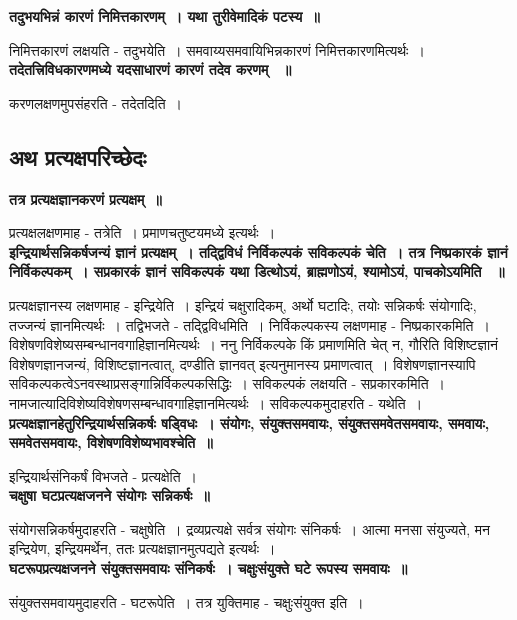 {\bfseries तदुभयभिन्नं कारणं निमित्तकारणम्~। यथा तुरीवेमादिकं पटस्य~॥}\par
	निमित्तकारणं लक्षयति - तदुभयेति~। समवाय्यसमवायिभिन्नकारणं निमित्तकारणमित्यर्थः~।\\[10pt]
{\bfseries तदेतत्त्रिविधकारणमध्ये यदसाधारणं कारणं तदेव करणम् ~॥}\par
	करणलक्षणमुपसंहरति - तदेतदिति~। \subsection*{अथ प्रत्यक्षपरिच्छेदः}
{\bfseries तत्र प्रत्यक्षज्ञानकरणं प्रत्यक्षम्~॥}\par
	प्रत्यक्षलक्षणमाह - तत्रेति~। प्रमाणचतुष्टयमध्ये इत्यर्थः~।\\[10pt]
{\bfseries इन्द्रियार्थसन्निकर्षजन्यं ज्ञानं प्रत्यक्षम्~। तद्द्विविधं निर्विकल्पकं सविकल्पकं चेति~। तत्र निष्प्रकारकं ज्ञानं निर्विकल्पकम्~। सप्रकारकं ज्ञानं सविकल्पकं यथा डित्थोऽयं, ब्राह्मणोऽयं, श्यामोऽयं, पाचकोऽयमिति ~॥}\par
	प्रत्यक्षज्ञानस्य लक्षणमाह - इन्द्रियेति~। इन्द्रियं चक्षुरादिकम्, अर्थो घटादिः, तयोः सन्निकर्षः संयोगादिः, तज्जन्यं ज्ञानमित्यर्थः~। तद्विभजते - तद्द्विविधमिति~। निर्विकल्पकस्य लक्षणमाह - निष्प्रकारकमिति~। विशेषणविशेष्यसम्बन्धानवगाहिज्ञानमित्यर्थः~। ननु निर्विकल्पके किं प्रमाणमिति चेत् न, गौरिति विशिष्टज्ञानं विशेषणज्ञानजन्यं, विशिष्टज्ञानत्वात्, दण्डीति ज्ञानवत् इत्यनुमानस्य प्रमाणत्वात्~। विशेषणज्ञानस्यापि सविकल्पकत्वेऽनवस्थाप्रसङ्गान्निर्विकल्पकसिद्धिः~। सविकल्पकं लक्षयति - सप्रकारकमिति~। नामजात्यादिविशेष्यविशेषणसम्बन्धावगाहिज्ञानमित्यर्थः~। सविकल्पकमुदाहरति - यथेति~।\\[10pt]
{\bfseries प्रत्यक्षज्ञानहेतुरिन्द्रियार्थसन्निकर्षः षड्विधः~। संयोगः, संयुक्तसमवायः, संयुक्तसमवेतसमवायः, समवायः, समवेतसमवायः, विशेषणविशेष्यभावश्चेति~॥}\par
	इन्द्रियार्थसंनिकर्षं विभजते - प्रत्यक्षेति~।\\[10pt]
{\bfseries चक्षुषा घटप्रत्यक्षजनने संयोगः सन्निकर्षः~॥}\par
	संयोगसन्निकर्षमुदाहरति - चक्षुषेति~। द्रव्यप्रत्यक्षे सर्वत्र संयोगः संनिकर्षः~। आत्मा मनसा संयुज्यते, मन इन्द्रियेण, इन्द्रियमर्थेन, ततः प्रत्यक्षज्ञानमुत्पद्यते इत्यर्थः~।\\[10pt]
{\bfseries घटरूपप्रत्यक्षजनने संयुक्तसमवायः संनिकर्षः~। चक्षुःसंयुक्ते घटे रूपस्य समवायः~॥}\par
	संयुक्तसमवायमुदाहरति - घटरूपेति~। तत्र युक्तिमाह - चक्षुःसंयुक्त इति~।\\[10pt]

